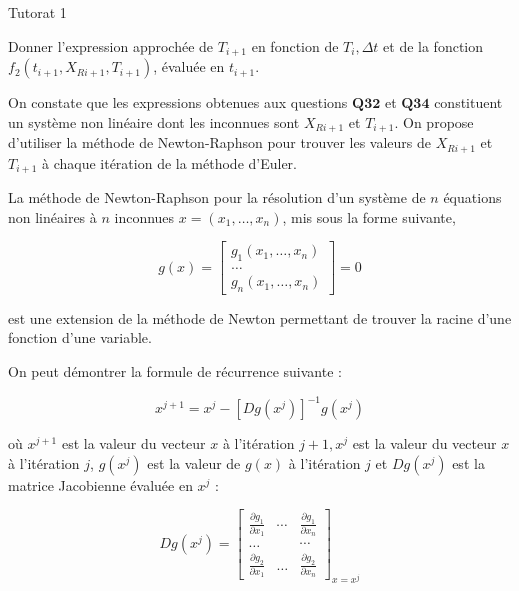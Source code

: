 \begin{exo}[PC][1][python]{Tutorat 1}
\begin{quest}
  \item Donner l'expression approchée de \(T_{i+1}\) en fonction de \(T_{i}, \Delta t\) et de la fonction \(f_{2}\left(t_{i+1}, X_{R i+1}, T_{i+1}\right)\), évaluée en \(t_{i+1}\).
\end{quest}
  

  On constate que les expressions obtenues aux questions \(\mathbf{Q 3 2}\) et \(\mathbf{Q 3 4}\) constituent un système non linéaire dont les inconnues sont \(X_{R i+1}\) et \(T_{i+1}\). On propose d'utiliser la méthode de Newton-Raphson pour trouver les valeurs de \(X_{R i+1}\) et \(T_{i+1}\) à chaque itération de la méthode d'Euler.
  
  La méthode de Newton-Raphson pour la résolution d'un système de \(n\) équations non linéaires à \(n\) inconnues \(x=\left(x_{1}, \ldots, x_{n}\right)\), mis sous la forme suivante,

\begin{equation}
  g(x)=\left[\begin{array}{c}
    g_{1}\left(x_{1}, \ldots, x_{n}\right) \\
    \ldots \\
    g_{n}\left(x_{1}, \ldots, x_{n}\right)
  \end{array}\right]= 0
\end{equation}

est une extension de la méthode de Newton permettant de trouver la racine d'une fonction d'une variable.

On peut démontrer la formule de récurrence suivante :

\begin{equation}\label{eq:recur}
  x^{j+1}=x^{j}-\left[D g\left(x^{j}\right)\right]^{-1} g\left(x^{j}\right)
\end{equation}

où \(x^{j+1}\) est la valeur du vecteur \(x\) à l'itération \(j+1, x^{j}\) est la valeur du vecteur \(x\) à l'itération \(j\), \(g\left(x^{j}\right)\) est la valeur de \(g(x)\) à l'itération \(j\) et \(D g\left(x^{j}\right)\) est la matrice Jacobienne évaluée en \(x^{j}\) :

\begin{equation}
  D g\left(x^{j}\right)=\left[\begin{array}{ccc}
    \frac{\partial g_{1}}{\partial x_{1}} & \cdots & \frac{\partial g_{1}}{\partial x_{n}} \\
    \ldots & & \cdots \\
    \frac{\partial g_{2}}{\partial x_{1}} & \ldots & \frac{\partial g_{2}}{\partial x_{n}}
  \end{array}\right]_{x=x^{j}}
\end{equation}


\end{exo}
